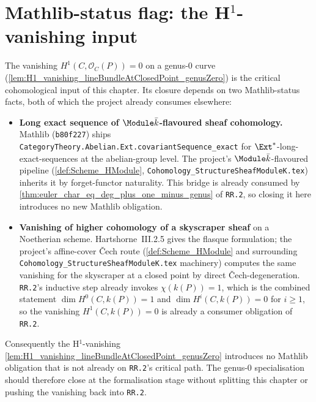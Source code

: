 \section{Mathlib-status flag: the H\(^1\)-vanishing input}

The vanishing \(H^1(C, \mathcal O_C(P)) = 0\) on a genus-\(0\) curve
(\cref{lem:H1_vanishing_lineBundleAtClosedPoint_genusZero}) is the
critical cohomological input of this chapter. Its closure depends on
two Mathlib-status facts, both of which the project already consumes
elsewhere:

\begin{itemize}
  \item \textbf{Long exact sequence of \(\Module \bar k\)-flavoured sheaf
    cohomology.} Mathlib (\texttt{b80f227}) ships
    \texttt{CategoryTheory.Abelian.Ext.covariantSequence\_exact} for
    \(\Ext^*\)-long-exact-sequences at the abelian-group level. The
    project's \(\Module \bar k\)-flavoured pipeline
    (\cref{def:Scheme_HModule}, \texttt{Cohomology\_StructureSheafModuleK.tex})
    inherits it by forget-functor naturality. This bridge is already
    consumed by \cref{thm:euler_char_eq_deg_plus_one_minus_genus} of
    \texttt{RR.2}, so closing it here introduces no new Mathlib
    obligation.
  \item \textbf{Vanishing of higher cohomology of a skyscraper sheaf}
    on a Noetherian scheme. Hartshorne~III.2.5 gives the flasque
    formulation; the project's affine-cover Čech route
    (\cref{def:Scheme_HModule} and surrounding
    \texttt{Cohomology\_StructureSheafModuleK.tex} machinery) computes
    the same vanishing for the skyscraper at a closed point by direct
    Čech-degeneration. \texttt{RR.2}'s inductive step already invokes
    \(\chi(k(P)) = 1\), which is the combined statement
    \(\dim H^0(C, k(P)) = 1\) and \(\dim H^i(C, k(P)) = 0\) for \(i \geq 1\),
    so the vanishing \(H^1(C, k(P)) = 0\) is already a consumer
    obligation of \texttt{RR.2}.
\end{itemize}

Consequently the H\(^1\)-vanishing
\cref{lem:H1_vanishing_lineBundleAtClosedPoint_genusZero} introduces no
Mathlib obligation that is not already on \texttt{RR.2}'s critical
path. The genus-\(0\) specialisation should therefore close at the
formalisation stage without splitting this chapter or pushing the
vanishing back into \texttt{RR.2}.


